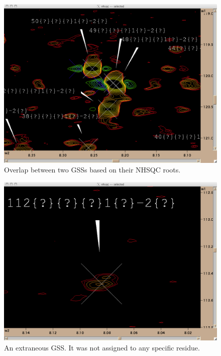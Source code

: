 \begin{figure}
  \includegraphics[scale=0.25]{figures/overlap}
  \caption{Overlap between two GSSs based on their NHSQC roots.}
  \label{overlap}
\end{figure}

\begin{figure}
  \includegraphics[scale=0.25]{figures/extraneous_gss}
  \caption{An extraneous GSS.  It was not assigned to any specific residue.}
  \label{extraneous_gss}
\end{figure}

